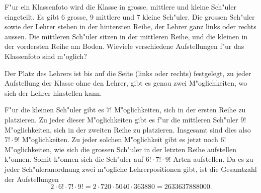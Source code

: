 F"ur ein Klassenfoto wird die Klasse in grosse, mittlere und kleine
Sch"uler eingeteilt. Es gibt 6 grosse, 9 mittlere und 7 kleine
Sch"uler. Die grossen Sch"uler sowie der Lehrer stehen in der
hintersten Reihe, der Lehrer ganz links oder rechts aussen. Die mittleren
Sch"uler sitzen in der mittleren Reihe, und die kleinen in der
vordersten Reihe am Boden. Wieviele verschiedene Aufstellungen f"ur das
Klassenfoto sind m"oglich?

\begin{loesung}
Der Platz des Lehrers ist bis auf die Seite (links oder rechts)
festgelegt, zu jeder Aufstellung der Klasse ohne den Lehrer, gibt
es genau zwei M"oglichkeiten, wo sich der Lehrer hinstellen kann.

F"ur die kleinen Sch"uler gibt es $7!$ M"oglichkeiten, sich in
der ersten Reihe zu platzieren. Zu jeder dieser M"oglichkeiten
gibt es f"ur die mittleren Sch"uler $9!$ M"oglichkeiten, sich in
der zweiten Reihe zu platzieren. Insgesamt sind dies also $7! \cdot 9!$
M"oglichkeiten. Zu jeder solchen M"oglichkeit gibt es jetzt noch $6!$
M"oglichkeiten, wie sich die grossen Sch"uler in der letzten Reihe
aufstellen k"onnen. Somit k"onnen sich die Sch"uler auf $6!\cdot 7!\cdot 9!$
Arten aufstellen. Da es zu jeder Sch"uleranordnung zwei m"ogliche
Lehrerpositionen gibt, ist die Gesamtzahl der Aufstellungen
\[
2\cdot 6!\cdot 7!\cdot 9!=
2\cdot 720 \cdot 5040 \cdot 363880=2633637888000.
\]
\end{loesung}

